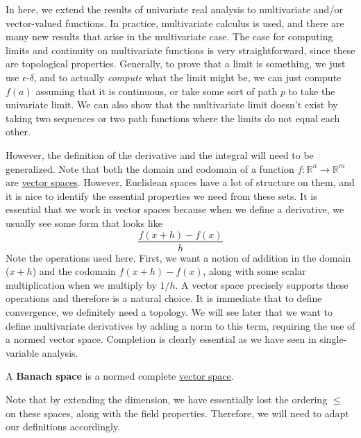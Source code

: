 In here, we extend the results of univariate real analysis to multivariate and/or vector-valued functions. In practice, multivariate calculus is used, and there are many new results that arise in the multivariate case. The case for computing limits and continuity on multivariate functions is very straightforward, since these are topological properties. Generally, to prove that a limit is something, we just use $\epsilon$-$\delta$, and to actually \textit{compute} what the limit might be, we can just compute $f(a)$ assuming that it is continuous, or take some sort of path $p$ to take the univariate limit. We can also show that the multivariate limit doesn't exist by taking two sequences or two path functions where the limits do not equal each other. 

However, the definition of the derivative and the integral will need to be generalized. Note that both the domain and codomain of a function $f: \mathbb{R}^n \to \mathbb{R}^m$ are \hyperref[lin-def:vector-space]{vector spaces}. However, Euclidean spaces have a lot of structure on them, and it is nice to identify the essential properties we need from these sets. It is essential that we work in vector spaces because when we define a derivative, we usually see some form that looks like 
\begin{equation}
	\frac{f(x + h) - f(x)}{h}
\end{equation} 
Note the operations used here. First, we want a notion of addition in the domain ($x + h$) and the codomain $f(x + h) - f(x)$, along with some scalar multiplication when we multiply by $1/h$. A vector space precisely supports these operations and therefore is a natural choice. It is immediate that to define convergence, we definitely need a topology. We will see later that we want to define multivariate derivatives by adding a norm to this term, requiring the use of a normed vector space. Completion is clearly essential as we have seen in single-variable analysis. 

\begin{definition}
  \label{def:banach-space}
	A \textbf{Banach space} is a normed complete \hyperref[lin-def:vector-space]{vector space}. 
\end{definition}

Note that by extending the dimension, we have essentially lost the ordering $\leq$ on these spaces, along with the field properties. Therefore, we will need to adapt our definitions accordingly. 


